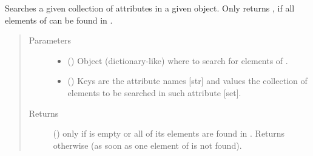 \documentclass[letterpaper,10pt,english]{sphinxmanual}
\begin{document}
\begin{fulllineitems}
\begin{fulllineitems}
\end{fulllineitems}


\begin{fulllineitems}
\label{\detokenize{main:pypath.main.PyPath.search_attr_and}}
Searches a given collection of attributes in a given object.
Only returns , if all elements of  can be found in
.
\begin{quote}\begin{description}
\item[{Parameters}] \leavevmode\begin{itemize}
\item {} 
 () \textendash{} Object (dictionary-like) where to search for elements of
.

\item {} 
 () \textendash{} Keys are the attribute names {[}str{]} and values the collection
of elements to be searched in such attribute {[}set{]}.

\end{itemize}

\item[{Returns}] \leavevmode
() \textendash{}  only if  is empty or all of its
elements are found in . Returns  otherwise (as
soon as one element of  is not found).

\end{description}\end{quote}

\end{fulllineitems}



\end{fulllineitems}
\end{document}
